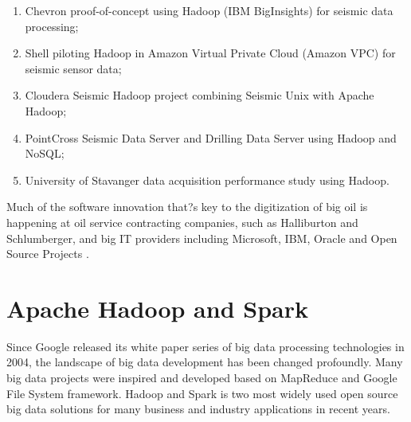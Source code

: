 \begin{enumerate}
  \item Chevron proof-of-concept using Hadoop (IBM BigInsights) for seismic data processing;
  \item Shell piloting Hadoop in Amazon Virtual Private Cloud (Amazon VPC) for seismic sensor data;
  \item Cloudera Seismic Hadoop project combining Seismic Unix with Apache Hadoop;
  \item PointCross Seismic Data Server and Drilling Data Server using Hadoop and NoSQL;
  \item University of Stavanger data acquisition performance study using Hadoop.
\end{enumerate}

Much of the software innovation that?s key to the digitization of big oil is happening at oil service contracting companies, such as Halliburton and Schlumberger, and big IT providers including Microsoft, IBM, Oracle and Open Source Projects \cite{bigdatatooil}.

\section{Apache Hadoop and Spark}

Since Google released its white paper series of big data processing technologies in 2004, the landscape of big data development has been changed profoundly. Many big data projects were inspired and developed based on MapReduce and Google File System framework. Hadoop and Spark is two most widely used open source big data solutions for many business and industry applications in recent years. 

